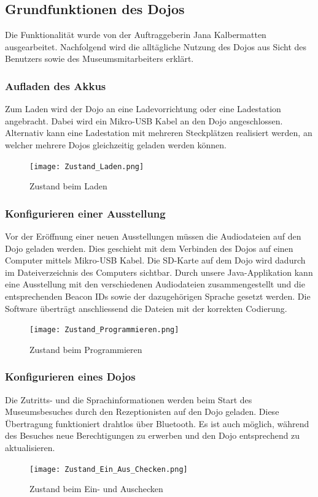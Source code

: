 \subsection{Grundfunktionen des Dojos}
Die Funktionalität wurde von der Auftraggeberin Jana Kalbermatten ausgearbeitet. Nachfolgend wird die alltägliche Nutzung des Dojos aus Sicht des Benutzers sowie des Museumsmitarbeiters erklärt.
\subsubsection{Aufladen des Akkus}
Zum Laden wird der Dojo an eine Ladevorrichtung oder eine Ladestation angebracht. Dabei wird ein Mikro-USB Kabel an den Dojo angeschlossen. Alternativ kann eine Ladestation mit mehreren Steckplätzen realisiert werden, an welcher mehrere Dojos gleichzeitig geladen werden können.
\begin{figure}[htb]
\texttt{[image: Zustand\_Laden.png]}
\caption{Zustand beim Laden} %
\label{fig:image2}
\end{figure}
\subsubsection{Konfigurieren einer Ausstellung}
Vor der Eröffnung einer neuen Ausstellungen müssen die Audiodateien auf den Dojo geladen werden. Dies geschieht mit dem Verbinden des Dojos auf einen Computer mittels Mikro-USB Kabel. Die SD-Karte auf dem Dojo wird dadurch im Dateiverzeichnis des Computers sichtbar. Durch unsere Java-Applikation kann eine Ausstellung mit den verschiedenen Audiodateien zusammengestellt und die entsprechenden Beacon IDs sowie der dazugehörigen Sprache gesetzt werden. Die Software überträgt anschliessend die Dateien mit der korrekten Codierung.
\begin{figure}[htb]
\texttt{[image: Zustand\_Programmieren.png]}
\caption{Zustand beim Programmieren} %
\label{fig:image3}
\end{figure}
\subsubsection{Konfigurieren eines Dojos}
Die Zutritts- und die Sprachinformationen werden beim Start des Museumsbesuches durch den Rezeptionisten auf den Dojo geladen. Diese Übertragung funktioniert drahtlos über Bluetooth. Es ist auch möglich, während des Besuches neue Berechtigungen zu erwerben und den Dojo entsprechend zu aktualisieren.
\begin{figure}[htb]
\texttt{[image: Zustand\_Ein\_Aus\_Checken.png]}
\caption{Zustand beim Ein- und Auschecken} %
\label{fig:image1}
\end{figure}
